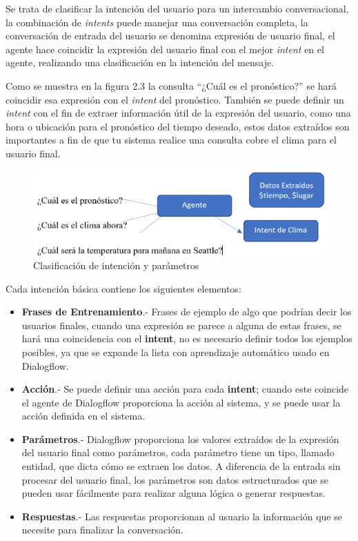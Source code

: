 \documentclass[letter, openright, 12pt]{book}
\begin{document}
Se trata de clasificar la intención del usuario para un intercambio conversacional, la combinación de \textit{intents} puede manejar una conversación completa, la conversación de entrada del usuario se denomina expresión de usuario final, el agente hace coincidir la expresión del usuario final con el mejor \textit{intent} en el agente, realizando una clasificación en la intención del mensaje.
\par
Como se muestra en la figura 2.3 la consulta “¿Cuál es el pronóstico?” se hará coincidir esa expresión con el \textit{intent} del pronóstico. También se puede definir un \textit{intent} con el fin de extraer información útil de la expresión del usuario, como una hora o ubicación para el pronóstico del tiempo deseado, estos datos extraídos son importantes a fin de que tu sistema realice una consulta cobre el clima para el usuario final. 

\begin{figure}[!h]
\includegraphics[width=1\textwidth]{figura2_3}
\caption{Clasificación de intención y parámetros}
\label{tab:figura2_3} 
\end{figure}


Cada intención básica contiene los siguientes elementos:
\begin{itemize}
\item \textbf{Frases de Entrenamiento}.- Frases de ejemplo de algo que podrían decir los usuarios finales, cuando una expresión se parece a alguna de estas frases, se hará una coincidencia con el \textbf{intent}, no es necesario definir todos los ejemplos posibles, ya que se expande la lista con aprendizaje automático usado en Dialogflow.
\item \textbf{Acción}.- Se puede definir una acción para cada \textbf{intent}; cuando este coincide el agente de Dialogflow proporciona la acción al sistema, y se puede usar la acción definida en el sistema. 
\item \textbf{Parámetros}.- Dialogflow proporciona los valores extraídos de la expresión del usuario final como parámetros, cada parámetro tiene un tipo, llamado entidad, que dicta cómo se extraen los datos. A diferencia de la entrada sin procesar del usuario final, los parámetros son datos estructurados que se pueden usar fácilmente para realizar alguna lógica o generar respuestas.
\item \textbf{Respuestas}.- Las respuestas proporcionan al usuario la información que se necesite para finalizar la conversación. 
\end{itemize}
\end{document}
